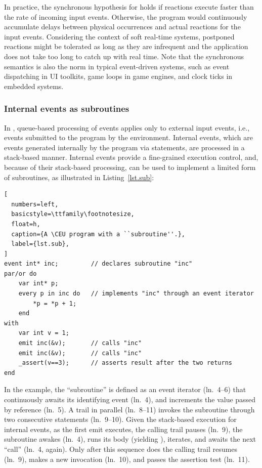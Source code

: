 In practice, the synchronous hypothesis for \CEU holds if reactions execute
faster than the rate of incoming input events.
%
Otherwise, the program would continuously accumulate delays between physical
occurrences and actual reactions for the input events.
%
Considering the context of soft real-time systems,
postponed reactions might be tolerated as long as they are infrequent and the
application does not take too long to catch up with real time.
%
Note that the synchronous semantics is also the norm in typical event-driven
systems, such as event dispatching in UI toolkits, game loops in game engines,
and clock ticks in embedded systems.

\subsubsection*{Internal events as subroutines}

In \CEU, queue-based processing of events applies only to external input
events, i.e., events submitted to the program by the environment.
%
Internal events, which are events generated internally by the program via
 statements, are processed in a stack-based manner.
%
Internal events provide a fine-grained execution control, and, because of their
stack-based processing, can be used to implement a limited form of subroutines,
as illustrated in Listing~\ref{lst.sub}:

\begin{lstlisting}[
  numbers=left,
  basicstyle=\ttfamily\footnotesize,
  float=h,
  caption={A \CEU program with a ``subroutine''.},
  label={lst.sub},
]
event int* inc;         // declares subroutine "inc"
par/or do
    var int* p;
    every p in inc do   // implements "inc" through an event iterator
        *p = *p + 1;
    end
with
    var int v = 1;
    emit inc(&v);       // calls "inc"
    emit inc(&v);       // calls "inc"
    _assert(v==3);      // asserts result after the two returns
end
\end{lstlisting}

In the example, the ``subroutine''  is defined as an event iterator
(ln.~4--6) that continuously awaits its identifying event (ln.~4), and
increments the value passed by reference (ln.~5).
%
A trail in parallel (ln.~8--11) invokes the subroutine through two consecutive
 statements (ln.~9--10).
%
Given the stack-based execution for internal events, as the first emit
executes, the calling trail pauses (ln.~9), the subroutine awakes (ln.~4), runs
its body (yielding ), iterates, and awaits the next ``call'' (ln.~4,
again).
%
Only after this sequence does the calling trail resumes (ln.~9), makes a new
invocation (ln.~10), and passes the assertion test (ln.~11).

